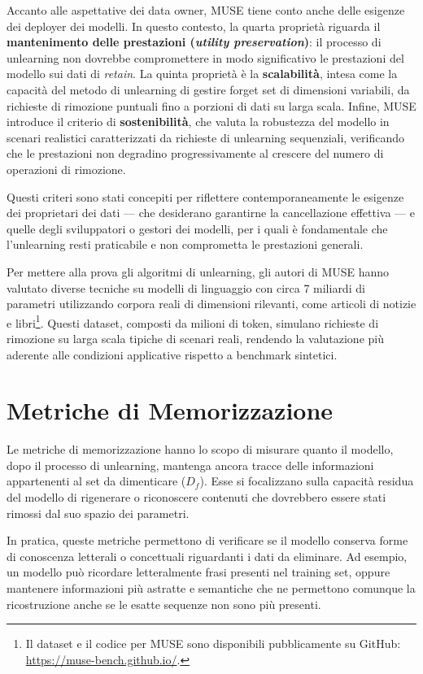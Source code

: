 Accanto alle aspettative dei data owner, MUSE tiene conto anche delle esigenze dei deployer dei modelli. In questo contesto, la quarta proprietà riguarda il \textbf{mantenimento delle prestazioni (\textit{utility preservation})}: il processo di unlearning non dovrebbe compromettere in modo significativo le prestazioni del modello sui dati di \emph{retain}.
La quinta proprietà è la \textbf{scalabilità}, intesa come la capacità del metodo di unlearning di gestire forget set di dimensioni variabili, da richieste di rimozione puntuali fino a porzioni di dati su larga scala.  
Infine, MUSE introduce il criterio di \textbf{sostenibilità}, che valuta la robustezza del modello in scenari realistici caratterizzati da richieste di unlearning sequenziali, verificando che le prestazioni non degradino progressivamente al crescere del numero di operazioni di rimozione.

Questi criteri sono stati concepiti per riflettere contemporaneamente le esigenze dei proprietari dei dati — che desiderano garantirne la cancellazione effettiva — e quelle degli sviluppatori o gestori dei modelli, per i quali è fondamentale che l’unlearning resti praticabile e non comprometta le prestazioni generali.

Per mettere alla prova gli algoritmi di unlearning, gli autori di MUSE hanno valutato diverse tecniche su modelli di linguaggio con circa 7 miliardi di parametri utilizzando corpora reali di dimensioni rilevanti, come articoli di notizie e libri\footnote{Il dataset e il codice per MUSE sono disponibili pubblicamente su GitHub: \url{https://muse-bench.github.io/}.}. Questi dataset, composti da milioni di token, simulano richieste di rimozione su larga scala tipiche di scenari reali, rendendo la valutazione più aderente alle condizioni applicative rispetto a benchmark sintetici.


\section{Metriche di Memorizzazione}

Le metriche di memorizzazione hanno lo scopo di misurare quanto il modello, dopo il processo di unlearning, mantenga ancora tracce delle informazioni appartenenti al set da dimenticare (\( D_f \)).  
Esse si focalizzano sulla capacità residua del modello di rigenerare o riconoscere contenuti che dovrebbero essere stati rimossi dal suo spazio dei parametri.  

In pratica, queste metriche permettono di verificare se il modello conserva forme di conoscenza letterali o concettuali riguardanti i dati da eliminare. Ad esempio, un modello può ricordare letteralmente frasi presenti nel training set, oppure mantenere informazioni più astratte e semantiche che ne permettono comunque la ricostruzione anche se le esatte sequenze non sono più presenti.  

